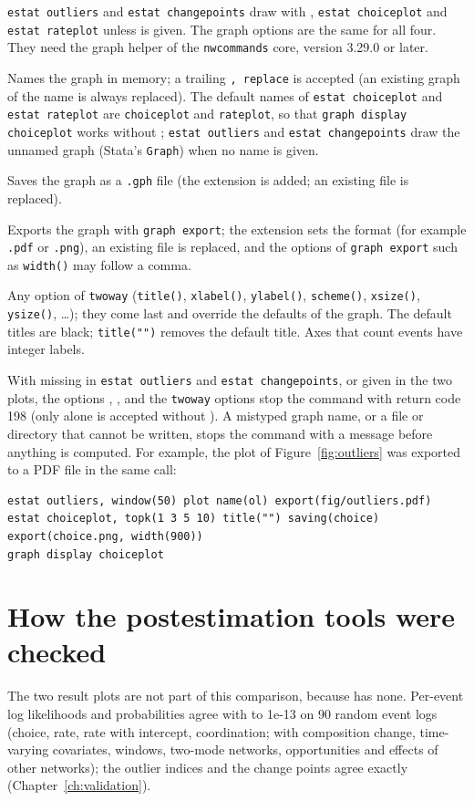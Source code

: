 \texttt{estat outliers} and \texttt{estat changepoints} draw with , \texttt{estat choiceplot} and \texttt{estat rateplot} unless  is given. The graph options are the same for all four. They need the graph helper of the \texttt{nwcommands} core, version 3.29.0 or later.
\begin{description}[style=nextline,nosep]
  \item[\opt{name(name)}] Names the graph in memory; a trailing \texttt{, replace} is accepted (an existing graph of the name is always replaced). The default names of \texttt{estat choiceplot} and \texttt{estat rateplot} are \texttt{choiceplot} and \texttt{rateplot}, so that \texttt{graph display choiceplot} works without ; \texttt{estat outliers} and \texttt{estat changepoints} draw the unnamed graph (Stata's \texttt{Graph}) when no name is given.
  \item[\opt{saving(filename)}] Saves the graph as a \texttt{.gph} file (the extension is added; an existing file is replaced).
  \item[\opt{export(filename [, options])}] Exports the graph with \texttt{graph export}; the extension sets the format (for example \texttt{.pdf} or \texttt{.png}), an existing file is replaced, and the options of \texttt{graph export} such as \texttt{width()} may follow a comma.
  \item[\emph{twoway\_options}] Any option of \texttt{twoway} (\texttt{title()}, \texttt{xlabel()}, \texttt{ylabel()}, \texttt{scheme()}, \texttt{xsize()}, \texttt{ysize()}, \dots); they come last and override the defaults of the graph. The default titles are black; \texttt{title("")} removes the default title. Axes that count events have integer labels.
\end{description}
With  missing in \texttt{estat outliers} and \texttt{estat changepoints}, or  given in the two plots, the options , ,  and the \texttt{twoway} options stop the command with return code 198 (only  alone is accepted without ). A mistyped graph name, or a file or directory that cannot be written, stops the command with a message before anything is computed. For example, the plot of Figure~\ref{fig:outliers} was exported to a PDF file in the same call:
\begin{lstlisting}
estat outliers, window(50) plot name(ol) export(fig/outliers.pdf)
estat choiceplot, topk(1 3 5 10) title("") saving(choice) export(choice.png, width(900))
graph display choiceplot
\end{lstlisting}

\section{How the postestimation tools were checked}

The two result plots are not part of this comparison, because \goldfish{} has none. Per-event log likelihoods and probabilities agree with \goldfish{} to 1e-13 on 90 random event logs (choice, rate, rate with intercept, coordination; with composition change, time-varying covariates, windows, two-mode networks, opportunities and effects of other networks); the outlier indices and the change points agree exactly (Chapter~\ref{ch:validation}).
